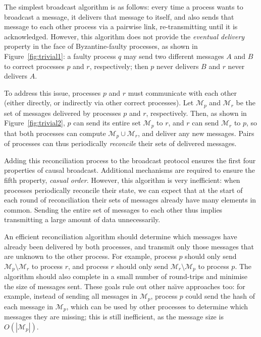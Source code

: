 \documentclass[a4paper,anonymous,USenglish]{lipics-v2019}
\begin{document}
The simplest broadcast algorithm is as follows: every time a process wants to broadcast a message, it delivers that message to itself, and also sends that message to each other process via a pairwise link, re-transmitting until it is acknowledged.
However, this algorithm does not provide the \emph{eventual delivery} property in the face of Byzantine-faulty processes, as shown in Figure~\ref{fig:trivial1}: a faulty process $q$ may send two different messages $A$ and $B$ to correct processes $p$ and $r$, respectively; then $p$ never delivers $B$ and $r$ never delivers $A$.

To address this issue, processes $p$ and $r$ must communicate with each other (either directly, or indirectly via other correct processes).
Let $\mathcal{M}_p$ and $\mathcal{M}_r$ be the set of messages delivered by processes $p$ and $r$, respectively.
Then, as shown in Figure~\ref{fig:trivial2}, $p$ can send its entire set $\mathcal{M}_p$ to $r$, and $r$ can send $\mathcal{M}_r$ to $p$, so that both processes can compute $\mathcal{M}_p \cup \mathcal{M}_r$, and deliver any new messages.
Pairs of processes can thus periodically \emph{reconcile} their sets of delivered messages.

Adding this reconciliation process to the broadcast protocol ensures the first four properties of causal broadcast.
Additional mechanisms are required to ensure the fifth property, \emph{casual order}.
However, this algorithm is very inefficient: when processes periodically reconcile their state, we can expect that at the start of each round of reconciliation their sets of messages already have many elements in common.
Sending the entire set of messages to each other thus implies transmitting a large amount of data unnecessarily.

An efficient reconciliation algorithm should determine which messages have already been delivered by both processes, and transmit only those messages that are unknown to the other process.
For example, process $p$ should only send $\mathcal{M}_p \setminus \mathcal{M}_r$ to process $r$, and process $r$ should only send $\mathcal{M}_r \setminus \mathcal{M}_p$ to process $p$.
The algorithm should also complete in a small number of round-trips and minimise the size of messages sent.
These goals rule out other na\"{\i}ve approaches too: for example, instead of sending all messages in $\mathcal{M}_p$, process $p$ could send the hash of each message in $\mathcal{M}_p$, which can be used by other processes to determine which messages they are missing; this is still inefficient, as the message size is $O(|\mathcal{M}_{p}|)$.
\end{document}
